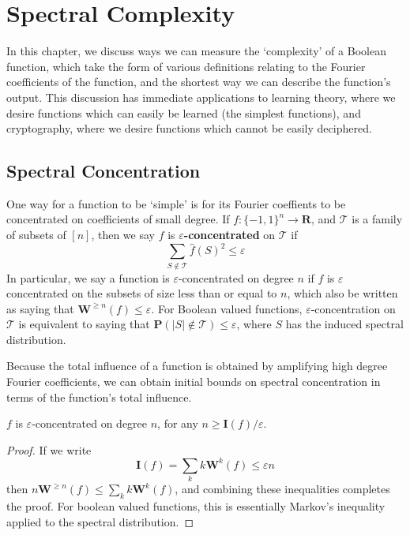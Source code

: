 \chapter{Spectral Complexity}

In this chapter, we discuss ways we can measure the `complexity' of a Boolean function, which take the form of various definitions relating to the Fourier coefficients of the function, and the shortest way we can describe the function's output. This discussion has immediate applications to learning theory, where we desire functions which can easily be learned (the simplest functions), and cryptography, where we desire functions which cannot be easily deciphered.

\section{Spectral Concentration}

One way for a function to be `simple' is for its Fourier coeffients to be concentrated on coefficients of small degree. If $f: \{ -1, 1 \}^n \to \mathbf{R}$, and $\mathcal{T}$ is a family of subsets of $[n]$, then we say $f$ is {\bf $\varepsilon$-concentrated} on $\mathcal{T}$ if
%
\[ \sum_{S \not \in \mathcal{T}} \widehat{f}(S)^2 \leq \varepsilon \]
%
In particular, we say a function is $\varepsilon$-concentrated on degree $n$ if $f$ is $\varepsilon$ concentrated on the subsets of size less than or equal to $n$, which also be written as saying that $\mathbf{W}^{\geq n}(f) \leq \varepsilon$. For Boolean valued functions, $\varepsilon$-concentration on $\mathcal{T}$ is equivalent to saying that $\mathbf{P}(|S| \not \in \mathcal{T}) \leq \varepsilon$, where $S$ has the induced spectral distribution.

Because the total influence of a function is obtained by amplifying high degree Fourier coefficients, we can obtain initial bounds on spectral concentration in terms of the function's total influence.

\begin{theorem}
    $f$ is $\varepsilon$-concentrated on degree $n$, for any $n \geq \mathbf{I}(f)/\varepsilon$.
\end{theorem}
\begin{proof}
    If we write
    \[ \mathbf{I}(f) = \sum_k k \mathbf{W}^k(f) \leq \varepsilon n \]
    then $n \mathbf{W}^{\geq n}(f) \leq \sum_k k \mathbf{W}^k(f)$, and combining these inequalities completes the proof. For boolean valued functions, this is essentially Markov's inequality applied to the spectral distribution.
\end{proof}

